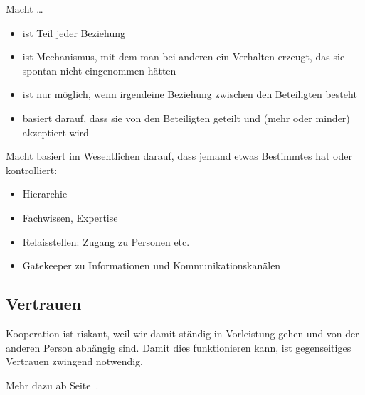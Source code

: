 Macht …

\begin{itemize}
  \item ist Teil jeder Beziehung
  \item ist Mechanismus, mit dem man bei anderen ein Verhalten erzeugt, das sie spontan nicht eingenommen hätten
  \item ist nur möglich, wenn irgendeine Beziehung zwischen den Beteiligten besteht
  \item basiert darauf, dass sie von den Beteiligten geteilt und (mehr oder minder) akzeptiert wird
\end{itemize}

Macht basiert im Wesentlichen darauf, dass jemand etwas Bestimmtes hat oder kontrolliert:

\begin{itemize}
  \item Hierarchie
  \item Fachwissen, Expertise
  \item Relaisstellen: Zugang zu Personen etc.
  \item Gatekeeper zu Informationen und Kommunikationskanälen
\end{itemize}


\subsection{Vertrauen}

Kooperation ist riskant, weil wir damit ständig in Vorleistung gehen und von der anderen Person abhängig sind. Damit dies funktionieren kann, ist gegenseitiges Vertrauen zwingend notwendig.

Mehr dazu ab Seite~\pageref{vertrauen-elemente}.
